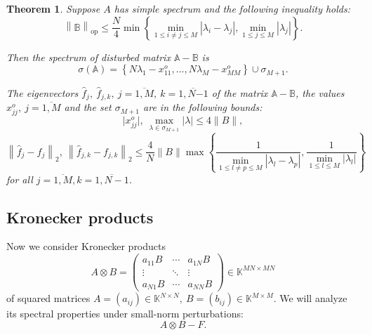 \documentclass[a4paper]{jpconf}
\newtheorem{nkjpcsthm}{Theorem}
\begin{document}
\begin{nkjpcsthm}
Suppose \( A \) has simple spectrum and the following inequality holds:
\[
    \left\| \mathbb{B} \right\|_{\mathrm{op}}
        \leq 
        \frac{N}{4}
         \min\left\{
             \min\limits_{1\leq i{\neq}j \leq M }{|\lambda_i - \lambda_j|},
             \min\limits_{1\leq j \leq M}{|\lambda_j|}
         \right\}.
 \]

Then the spectrum of disturbed matrix \( \mathbb{A} - \mathbb{B} \) is
\[
    \sigma\left(\mathbb{A}\right) =
        \left\{
            N\lambda_1 - x_{11}^o, \ldots, N\lambda_M - x_{MM}^o
        \right\}
    \cup \sigma_{M{+}1}.
\]

The eigenvectors
    \( \hat{f}_j,\ \hat{f}_{j,k},\ j{=}\overline{1,M},\ k{=}\overline{1,N{-1}} \)
    of the matrix \( \mathbb{A}{-}\mathbb{B} \),
    the values \( x_{jj}^o,\ j{=}\overline{1,M} \)
    and the set \( \sigma_{M{+}1} \) are in the following bounds:
\[
    \lvert x_{jj}^o\rvert,
    \ \max_{\lambda\in\sigma_{M{+}1}} \lvert\lambda\rvert
    \leq 4\|B\|,
\]
\[
    \left\| \hat{f}_j - f_j \right\|_2,
    \ \left\| \hat{f}_{j,k} - f_{j,k}\right\|_2
    \leq
    \frac4N \|B\|
         \max\left\{
         \frac{1}{
             \min\limits_{1\leq l{\neq}p \leq M }{|\lambda_l - \lambda_p|}},
         \frac{1}{
             \min\limits_{1\leq l \leq M}{|\lambda_l|}}
         \right\}
\]
for all \( j{=}\overline{1,M}, k{=}\overline{1,N-1} \).
\end{nkjpcsthm}

\subsection*{Kronecker products}

Now we consider Kronecker products
\[
    A\otimes B =
    \begin{pmatrix}
        a_{11} B & \cdots & a_{1N} B \\
        \vdots   & \ddots & \vdots \\
        a_{N1} B & \cdots & a_{NN} B
    \end{pmatrix}
    \in \mathbb{K}^{{MN}{\times}{MN}}
\]
of squared matrices
\( A={(a_{ij})}\in\mathbb{K}^{N{\times}N},
 \ B={(b_{ij})}\in\mathbb{K}^{M{\times}M}. \)
We will analyze its spectral properties
    under small-norm perturbations:
\[
    A\otimes B - F.
\]

\end{document}
